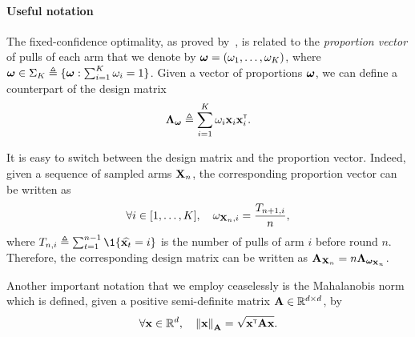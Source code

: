 \paragraph{Useful notation}
The fixed-confidence optimality, as proved by~\cite{garivier2016tracknstop,russo2016ttts}, is related to the \emph{proportion vector} of pulls of each arm that we denote by ${\boldsymbol \omega} = (\omega_1,\ldots,\omega_K)$, where ${\boldsymbol \omega}\in\Sigma_K \triangleq \{{\boldsymbol \omega} : \sum_{i=1}^K \omega_i = 1\}$. Given a vector of proportions ${\boldsymbol \omega}$, we can define a counterpart of the design matrix 
\[
    {\boldsymbol \Lambda}_{{\boldsymbol \omega}} \triangleq \sum_{i=1}^K \omega_i{\bf x}_i{\bf x}_i^\mathsf{\scriptscriptstyle T}.
\]

It is easy to switch between the design matrix and the proportion vector. Indeed, given a sequence of sampled arms ${\bf X}_n$, the corresponding proportion vector can be written as
\[
    \forall i\in [1,\ldots,K], \quad \omega_{{\bf X}_n,i} = \frac{T_{n+1,i}}{n},
\]
where $T_{n,i} \eqdef \sum_{t=1}^{n-1} \1\{\hat{\bx_t} = i\}$ is the number of pulls of arm $i$ before round $n$. Therefore, the corresponding design matrix can be written as ${\bf A}_{{\bf X}_n}=n{\boldsymbol \Lambda}_{{\boldsymbol \omega}_{{\bf X}_n}}$.

Another important notation that we employ ceaselessly is the Mahalanobis norm which is defined, given a positive semi-definite matrix ${\bf A}\in\mathbb{R}^{d\times d}$, by
\[
    \forall {\bf x}\in\mathbb{R}^d, \quad \left\lVert{\bf x}\right\rVert_{{\bf A}} = \sqrt{{\bf x}^\mathsf{\scriptscriptstyle T}{\bf A}{\bf x}}.
\]

